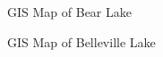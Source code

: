 
\begin{figure}[t]
\centerline{%
  }
\caption{GIS Map of Bear Lake}
\end{figure}

\begin{figure}[t]
\centerline{%
  }
\caption{GIS Map of Belleville Lake}
\end{figure}

